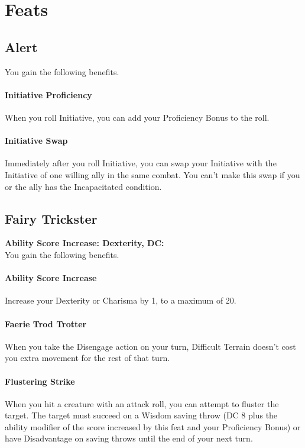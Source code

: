 \documentclass[letterpaper,openany,oneside,twocolumn]{book}
\begin{document}
\section*{Feats}
\subsection*{Alert}
You gain the following benefits.

\paragraph*{Initiative Proficiency} When you roll Initiative, you can add your Proficiency Bonus to the roll.

\paragraph*{Initiative Swap} Immediately after you roll Initiative, you can swap your Initiative with the Initiative of one willing ally in the same combat. You can't make this swap if you or the ally has the Incapacitated condition.
\subsection*{Fairy Trickster}
\textbf{Ability Score Increase: Dexterity, DC: }\\
You gain the following benefits.

\paragraph*{Ability Score Increase} Increase your Dexterity or Charisma by 1, to a maximum of 20.

\paragraph*{Faerie Trod Trotter} When you take the Disengage action on your turn, Difficult Terrain doesn't cost you extra movement for the rest of that turn.

\paragraph*{Flustering Strike} When you hit a creature with an attack roll, you can attempt to fluster the target. The target must succeed on a Wisdom saving throw (DC 8 plus the ability modifier of the score increased by this feat and your Proficiency Bonus) or have Disadvantage on saving throws until the end of your next turn.
\end{document}
